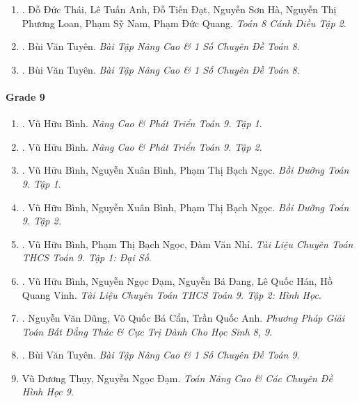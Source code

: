 \documentclass{article}
\begin{document}
\begin{enumerate}
	\item \cite{SGK_Toan_8_CD_tap_2}. Đỗ Đức Thái, Lê Tuấn Anh, Đỗ Tiến Đạt, Nguyễn Sơn Hà, Nguyễn Thị Phương Loan, Phạm Sỹ Nam, Phạm Đức Quang. {\it Toán 8 Cánh Diều Tập 2}.\hfill{\sf[reading]}

	\item \cite{Tuyen_Toan_8}. Bùi Văn Tuyên. {\it Bài Tập Nâng Cao \& 1 Số Chuyên Đề Toán 8}.\hfill{\sf[reading]}

	\item \cite{Tuyen_Toan_8_old}. Bùi Văn Tuyên. {\it Bài Tập Nâng Cao \& 1 Số Chuyên Đề Toán 8}.\hfill{\sf[done]}
\end{enumerate}

\paragraph{Grade 9}

\begin{enumerate}
	\item \cite{Binh_Toan_9_tap_1}. Vũ Hữu Bình. {\it Nâng Cao \& Phát Triển Toán 9. Tập 1}.\hfill{\sf[done]}

	\item \cite{Binh_Toan_9_tap_2}. Vũ Hữu Bình. {\it Nâng Cao \& Phát Triển Toán 9. Tập 2}.\hfill{\sf[done]}

	\item \cite{Binh_boi_duong_Toan_9_tap_1}. Vũ Hữu Bình, Nguyễn Xuân Bình, Phạm Thị Bạch Ngọc. {\it Bồi Dưỡng Toán 9. Tập 1}.\hfill{\sf[done]}

	\item \cite{Binh_boi_duong_Toan_9_tap_2}. Vũ Hữu Bình, Nguyễn Xuân Bình, Phạm Thị Bạch Ngọc. {\it Bồi Dưỡng Toán 9. Tập 2.}\hfill{\sf[done]}

	\item \cite{TLCT_THCS_Toan_9_dai_so}. Vũ Hữu Bình, Phạm Thị Bạch Ngọc, Đàm Văn Nhỉ. {\it Tài Liệu Chuyên Toán THCS Toán 9. Tập 1: Đại Số}.\hfill{\sf[done]}

	\item \cite{TLCT_THCS_Toan_9_hinh_hoc}. Vũ Hữu Bình, Nguyễn Ngọc Đạm, Nguyễn Bá Đang, Lê Quốc Hán, Hồ Quang Vinh. {\it Tài Liệu Chuyên Toán THCS Toán 9. Tập 2: Hình Học}.\hfill{\sf[done]}

	\item \cite{Dung_Can_Anh_bdt_8_9}. Nguyễn Văn Dũng, Võ Quốc Bá Cẩn, Trần Quốc Anh. {\it Phương Pháp Giải Toán Bất Đẳng Thức \& Cực Trị Dành Cho Học Sinh 8, 9}.\hfill{\sf[reading]}

	\item \cite{Tuyen_Toan_9_old}. Bùi Văn Tuyên. {\it Bài Tập Nâng Cao \& 1 Số Chuyên Đề Toán 9}.\hfill{\sf[done]}

	\item Vũ Dương Thụy, Nguyễn Ngọc Đạm. {\it Toán Nâng Cao \& Các Chuyên Đề Hình Học 9}.
\end{enumerate}
\end{document}
